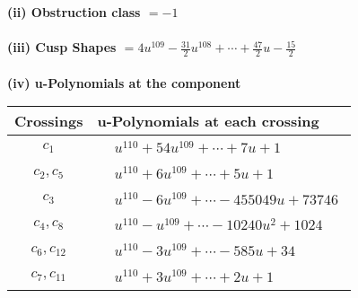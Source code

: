 \documentclass[1p]{elsarticle_modified}
\theoremstyle{definition}
\begin{document}
\flushleft \textbf{(ii) Obstruction class $= -1$}\\~\\
\flushleft \textbf{(iii) Cusp Shapes $= 4 u^{109}-\frac{31}{2} u^{108}+\cdots+\frac{47}{2} u-\frac{15}{2}$}\\~\\
\newpage\renewcommand{\arraystretch}{1}
\flushleft \textbf{(iv) u-Polynomials at the component}\newline \\
\begin{tabular}{m{50pt}|m{274pt}}
Crossings & \hspace{64pt}u-Polynomials at each crossing \\
\hline $$\begin{aligned}c_{1}\end{aligned}$$&$\begin{aligned}
&u^{110}+54 u^{109}+\cdots+7 u+1
\end{aligned}$\\
\hline $$\begin{aligned}c_{2},c_{5}\end{aligned}$$&$\begin{aligned}
&u^{110}+6 u^{109}+\cdots+5 u+1
\end{aligned}$\\
\hline $$\begin{aligned}c_{3}\end{aligned}$$&$\begin{aligned}
&u^{110}-6 u^{109}+\cdots-455049 u+73746
\end{aligned}$\\
\hline $$\begin{aligned}c_{4},c_{8}\end{aligned}$$&$\begin{aligned}
&u^{110}- u^{109}+\cdots-10240 u^2+1024
\end{aligned}$\\
\hline $$\begin{aligned}c_{6},c_{12}\end{aligned}$$&$\begin{aligned}
&u^{110}-3 u^{109}+\cdots-585 u+34
\end{aligned}$\\
\hline $$\begin{aligned}c_{7},c_{11}\end{aligned}$$&$\begin{aligned}
&u^{110}+3 u^{109}+\cdots+2 u+1
\end{aligned}$\\

\end{tabular}
\end{document}
